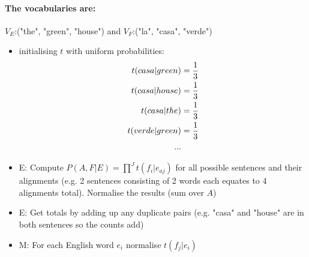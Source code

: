 \documentclass[]{article}
\begin{document}
\paragraph{The vocabularies are:\\}
$V_E$:("the", "green", "house") and $V_F$:("la", "casa", "verde")
\begin{itemize}
	\item initialising $t$ with uniform probabilities:
	\begin{align}
	t(casa|green)&=\frac{1}{3} \notag \\
	t(casa|house)&=\frac{1}{3} \notag \\
	t(casa|the)&=\frac{1}{3} \notag \\
	t(verde|green)&=\frac{1}{3} \notag \\
	... \notag
	\end{align}

	\item E: Compute $P(A,F|E) = \prod^J t(f_i|e_{aj})$ for all possible sentences and their alignments (e.g. 2 sentences consisting of 2 words each equates to 4 alignments total). Normalise the results (sum over $A$)
	\item E: Get totals by adding up any duplicate pairs (e.g. "casa" and "house" are in both sentences so the counts add)
	\item M: For each English word $e_i$ normalise $t(f_j|e_i)$ 
	
\end{itemize}
\end{document}
